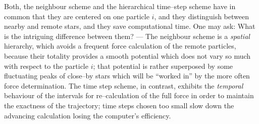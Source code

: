 Both, the neighbour scheme and the hierarchical time--step scheme
have in common that they are centered on one particle $i$,
and they distinguish between nearby and remote stars, and they
save computational time.
One may ask: What is the intriguing difference between them? ---
The neighbour scheme is a \emph{spatial} hierarchy, which
avoids a frequent force calculation of the remote particles,
because their totality provides a smooth potential which
does not vary so much with respect to the particle $i$;
that potential is rather superposed by some fluctuating peaks of
close--by stars which will be ``worked in'' by the more often
force determination.
The time step scheme, in contrast, exhibits the \emph{temporal}
behaviour of the intervals for re--calculation of the full
force in order to maintain the exactness of the trajectory;
time steps chosen too small slow down the advancing calculation
losing the computer's efficiency.


